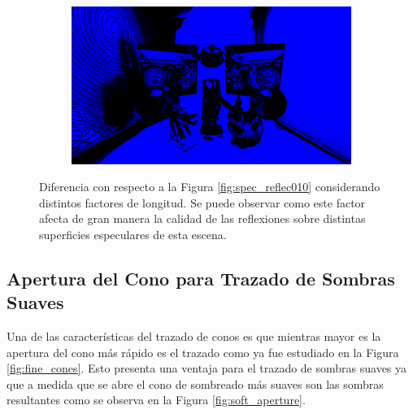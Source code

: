 \begin{figure}[H]
\begin{subfigure}[b]{.49\linewidth}
	\end{subfigure}%
	\hspace{0.01\textwidth}
	\begin{subfigure}[b]{.49\linewidth}
		\centering
		\captionsetup{justification=centering}
		\caption*{}
		\includegraphics[width=\linewidth]{media/finals/test_s250_diff.png}
	\end{subfigure}%
	\caption{Diferencia con respecto a la Figura \ref{fig:spec_reflec010} considerando distintos factores de longitud. Se puede observar como este factor afecta de gran manera la calidad de las reflexiones sobre distintas superficies especulares de esta escena.}
	\label{fig:spec_reflex_comp1}
\end{figure}

\subsection{Apertura del Cono para Trazado de Sombras Suaves}

Una de las características del trazado de conos es que mientras mayor es la apertura del cono más rápido es el trazado como ya fue estudiado en la Figura \ref{fig:fine_cones}. Esto presenta una ventaja para el trazado de sombras suaves ya que a medida que se abre el cono de sombreado más suaves son las sombras resultantes como se observa en la Figura \ref{fig:soft_aperture}.

